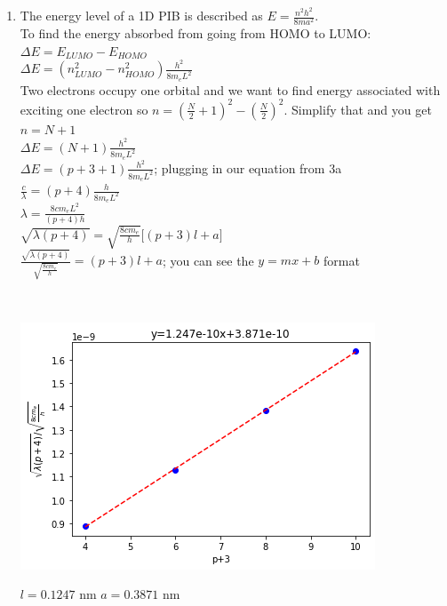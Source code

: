 \documentclass{article}
\begin{document}
\begin{enumerate}
\begin{enumerate}
\item The energy level of a 1D PIB is described as $E=\frac{n^2h^2}{8ma^2}$.
\\To find the energy absorbed from going from HOMO to LUMO:
\\ $\Delta E= E_{LUMO}-E_{HOMO}$
\\ $\Delta E=(n_{LUMO}^2-n_{HOMO}^2)\frac{h^2}{8m_eL^2}$
\\ Two electrons occupy one orbital and we want to find energy associated with exciting one electron so $n=(\frac{N}{2}+1)^2-(\frac{N}{2})^2$. Simplify that and you get $n=N+1$
\\ $\Delta E= (N+1) \frac{h^2}{8m_eL^2}$
\\ $\Delta E= (p+3+1) \frac{h^2}{8m_eL^2}$; plugging in our equation from 3a
\\ $\frac{c}{\lambda}= (p+4) \frac{h}{8m_eL^2}$
\\ $\lambda=\frac{8cm_eL^2}{(p+4)h}$
\\ $\sqrt{\lambda(p+4)}=\sqrt{\frac{8cm_e}{h}}\Big[(p+3)l+a\Big]$
\\ $\frac{\sqrt{\lambda(p+4)}}{\sqrt{\frac{8cm_e}{h}}}=(p+3)l+a$; you can see the $y=mx+b$ format

\\\centerline{\includegraphics[scale=0.7]{download.png}}
$l=0.1247$ nm
$a=0.3871$ nm

\end{enumerate}
\end{enumerate}%
\end{document}
